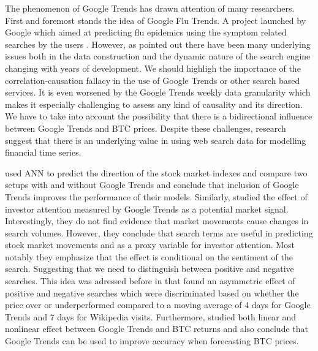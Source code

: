 The phenomenon of Google Trends has drawn attention of many researchers.
First and foremost stands the idea of Google Flu Trends. A project
launched by Google which aimed at predicting flu epidemics using the symptom
related searches by the users \cite{Ginsberg2009}. However, as \cite{Lazer2014}
pointed out there have been many underlying issues both in the data construction
and the dynamic nature of the search engine changing with years of development.
We should highligh the importance of the correlation-causation fallacy in
the use of Google Trends or other search based services. It is even worsened
by the Google Trends weekly data granularity which makes it especially challenging 
to assess any kind of causality and its direction. We have to take into
account the possibility that there is a bidirectional influence 
between Google Trends and \ac{BTC} prices. Despite these challenges, research 
suggest that there is an underlying value in using web search data for modelling
financial time series.



\cite{Hu2018} used \ac{ANN} to predict the direction of the stock market
indexes and compare two setups with and without Google Trends and conclude that 
inclusion of Google Trends improves the performance of their models. Similarly,
\cite{Huang2019} studied the effect of investor attention measured by Google Trends
as a potential market signal. Interestingly, they do not find evidence that
market movements cause changes in search volumes. However, they conclude that
search terms are useful in predicting stock market movements
and as a proxy variable for investor attention. Most notably they emphasize 
that the effect is conditional on the sentiment of the search. Suggesting
that we need to distinguish between positive and negative searches. This idea
was adressed before in \cite{Kristoufek2013} that found an asymmetric effect of 
positive and negative searches which were discriminated based on whether 
the price over or underperformed compared to a moving average of 4 days
for Google Trends and 7 days for Wikipedia visits. Furthermore, \cite{Arratia2021}
studied both linear and nonlinear effect between Google Trends and \ac{BTC} returns
and also conclude that Google Trends can be used to improve accuracy when forecasting
\ac{BTC} prices.





